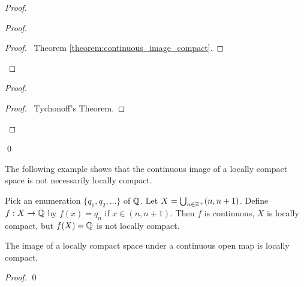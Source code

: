 \begin{proof}
\begin{proof}
        \begin{proof}
            \pf\ Theorem \ref{theorem:continuous_image_compact}.
        \end{proof}
    \end{proof}
    \begin{proof}
        \begin{proof}
            \pf\ Tychonoff's Theorem.
        \end{proof}
    \end{proof}
    \qed
\end{proof}

The following example shows that the continuous image of a locally compact space is not necessarily
locally compact.

\begin{example}
    Pick an enumeration $\{ q_1, q_2, \ldots \}$ of $\mathbb{Q}$. Let $X = \bigcup_{n \in \mathbb{Z}^+} (n, n+1)$.
    Define $f : X \rightarrow \mathbb{Q}$ by $f(x) = q_n$ if $x \in (n, n+1)$. Then $f$ is continuous,
    $X$ is locally compact, but $f(X) = \mathbb{Q}$ is not locally compact.
\end{example}

\begin{proposition}
    \label{proposition:continuous_open_image_locally_compact}
    The image of a locally compact space under a continuous open map is locally compact.
\end{proposition}

\begin{proof}
    \pf
    \qed
\end{proof}

